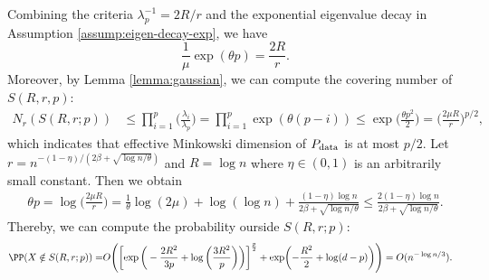     Combining the criteria $\lambda_p^{-1}=2R/r$ and the exponential eigenvalue decay in Assumption \ref{assump:eigen-decay-exp}, we have
    \begin{equation*}
        \frac{1}{\mu} \exp(\theta p ) = \frac{2R}{r}.
    \end{equation*}
    Moreover, by Lemma \ref{lemma:gaussian}, we can compute the covering number of $S(R,r,p)$:
    \begin{align*}
        N_r(S(R,r;p)) &\leq \prod_{i=1}^p \bigg( \frac{\lambda_i}{\lambda_p}\bigg) =  \prod_{i=1}^p \exp(\theta(p-i)) \leq \exp\biggl( \frac{\theta p^2}{2} \biggr) =  \biggl( \frac{2\mu R}{r} \biggr)^{p/2},
    \end{align*}
    which indicates that effective Minkowski dimension of $P_{\rm data}$ is at most $p/2$. Let $r=n^{-(1-\eta)/(2\beta+\sqrt{\log n /\theta})}$ and $R=\log n$ where $\eta\in(0,1)$ is an arbitrarily small constant. Then we obtain
    \begin{align*}
        \theta p = \log\biggl( \frac{2\mu R}{r} \biggr)=  \frac{1}{\theta} \log( 2\mu)+ \log( \log n )+ \frac{(1-\eta)\log n}{2\beta +\sqrt{\log n /\theta}}  \leq \frac{2(1-\eta)\log n}{2\beta +\sqrt{\log n /\theta}}.
    \end{align*}
    Thereby, we can compute the probability ourside $S(R,r;p)$:
    \begin{align*}
        \PP(X \notin S(R,r;p) ) =& O \Biggl( \biggl[ \exp \bigg(-\frac{2R^2}{3p} + \log\bigg( \frac{3R^2}{p} \bigg) \bigg) \biggr]^{\frac{p}{2}}  + \exp\biggl( -\frac{R^2}{2}+\log(d-p)  \biggr) \Biggr) = O(n^{-\log n/3}).
    \end{align*}
    
